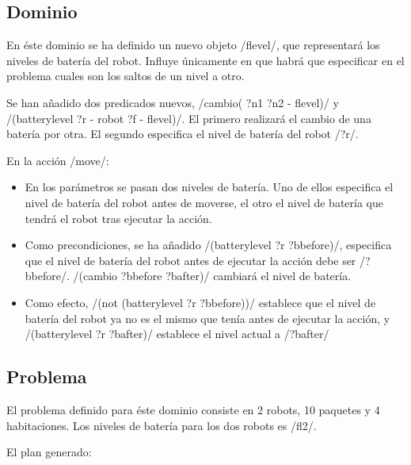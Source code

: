 \documentclass[	DIV=calc,%
							paper=a4,%
							fontsize=11pt]{scrartcl}	 					%
\newcommand{\lispscript}[2]{
    \myLisp[label=#2]{#1}
}
\begin{document}
\subsection{Dominio}
\label{sub:Dominio}

En éste dominio se ha definido un nuevo objeto \newlispinline/flevel/, que representará los niveles de batería del robot. Influye únicamente
en que habrá que especificar en el problema cuales son los saltos de un nivel a otro.

Se han añadido dos predicados nuevos, \newlispinline/cambio( ?n1 ?n2 - flevel)/ y\\ \newlispinline/(batterylevel ?r - robot ?f - flevel)/. El primero realizará el cambio de una batería por otra. El segundo especifica el nivel de batería del robot \newlispinline/?r/.

En la acción \newlispinline/move/:

\begin{itemize}
	\item En los parámetros se pasan dos niveles de batería. Uno de ellos especifica el nivel de batería del robot antes de moverse, el otro el nivel de batería que tendrá el robot tras ejecutar la acción.
	\item Como precondiciones, se ha añadido \newlispinline/(batterylevel ?r ?bbefore)/, especifica que el nivel de batería del robot antes de ejecutar la acción debe ser \newlispinline/?bbefore/. \newlispinline/(cambio ?bbefore ?bafter)/ cambiará el nivel de batería.
	\item Como efecto, \newlispinline/(not (batterylevel ?r ?bbefore))/ establece que el nivel de batería del robot ya no es el mismo que tenía antes de ejecutar la acción, y \newlispinline/(batterylevel ?r ?bafter)/ establece el nivel actual a \newlispinline/?bafter/
\end{itemize}

\lispscript{../d2.pddl}{Dominio2.pddl}

\subsection{Problema}
\label{sub:Problema}

El problema definido para éste dominio consiste en 2 robots, 10 paquetes y 4 habitaciones. Los niveles de batería para los dos robots es \newlispinline/fl2/.

\lispscript{../p1e2.pddl}{p1e2.pddl}

El plan generado:
\end{document}
